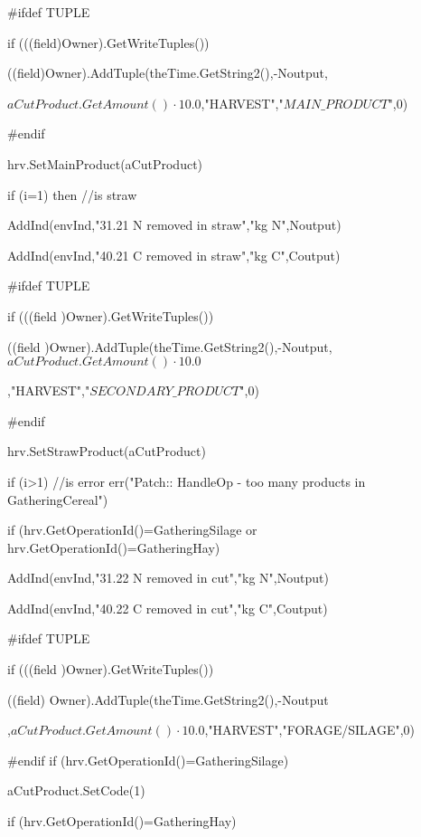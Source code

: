 \documentclass[%
]{scrartcl}
\begin{document}
{{{\#ifdef TUPLE
             
  if (((field)Owner).GetWriteTuples())
                
  ((field)Owner).AddTuple(theTime.GetString2(),-Noutput,

$aCutProduct.GetAmount() \cdot 10.0$,"HARVEST","$MAIN\_PRODUCT$",0)

\#endif
             
  hrv.SetMainProduct(aCutProduct)
            
          
  if (i=1) then  //is straw
           
            
   AddInd(envInd,"31.21 N removed in straw","kg N",Noutput)
              
 AddInd(envInd,"40.21 C removed in straw","kg C",Coutput)

\#ifdef TUPLE
             
  if (((field  )Owner).GetWriteTuples())
                
  ((field )Owner).AddTuple(theTime.GetString2(),-Noutput,$aCutProduct.GetAmount() \cdot 10.0$

,"HARVEST","$SECONDARY\_PRODUCT$",0)

\#endif
             
  hrv.SetStrawProduct(aCutProduct)
           

           
 if (i>1)   //is error
               err("Patch:: HandleOp - too many products in GatheringCereal")
     
   
       
  if (hrv.GetOperationId()=GatheringSilage or hrv.GetOperationId()=GatheringHay)
        
       
     AddInd(envInd,"31.22 N removed in cut","kg N",Noutput)
         
   AddInd(envInd,"40.22 C removed in cut","kg C",Coutput)

\#ifdef TUPLE
            
if (((field )Owner).GetWriteTuples())
              
 ((field) Owner).AddTuple(theTime.GetString2(),-Noutput

,$aCutProduct.GetAmount() \cdot 10.0$,"HARVEST","FORAGE/SILAGE",0)

\#endif
            if (hrv.GetOperationId()=GatheringSilage)
           
    aCutProduct.SetCode(1)
            
if (hrv.GetOperationId()=GatheringHay)
          
}}}
\end{document}
